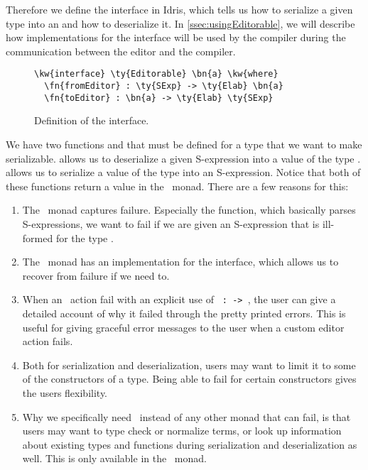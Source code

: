 Therefore we define the interface  in Idris, which tells us
how to serialize a given type into an  and how to deserialize it.
In \autoref{ssec:usingEditorable}, we will describe how implementations for
the  interface will be used by the compiler during the
communication between the editor and the compiler.

\begin{figure}[ht]
\caption{Definition of the  interface.}
\label{code:editorable}
\begin{Verbatim}[framesep=2mm, label=\footnotesize{\normalfont{Idris}}, labelposition=topline]
\kw{interface} \ty{Editorable} \bn{a} \kw{where}
  \fn{fromEditor} : \ty{SExp} -> \ty{Elab} \bn{a}
  \fn{toEditor} : \bn{a} -> \ty{Elab} \ty{SExp}
\end{Verbatim}
\end{figure}

We have two functions  and  that must be defined
for a type that we want to make serializable.
 allows us to deserialize a given S-expression into a value of the type .
 allows us to serialize a value of the type  into an S-expression.
Notice that both of these functions return a value in the \Elab\ monad.
There are a few reasons for this:
\begin{enumerate}
  \item The \Elab\ monad captures failure. Especially the 
    function, which basically parses S-expressions, we want to fail if we are
    given an S-expression that is ill-formed for the type .
  \item The \Elab\ monad has an implementation for the 
    interface, which allows us to recover from failure if we need to.
  \item When an \Elab\ action fail with an explicit use of
    \texttt{ :  ->  },
    the user can give a detailed account of why it failed through the pretty
    printed errors. This is useful for giving graceful error messages to the
    user when a custom editor action fails.
  \item Both for serialization and deserialization, users may want to limit it
    to some of the constructors of a type. Being able to fail for certain
    constructors gives the users flexibility.
  \item Why we specifically need \Elab\ instead of any other monad that can
    fail, is that users may want to type check or normalize terms, or look up
    information about existing types and functions during serialization and
    deserialization as well. This is only available in the \Elab\ monad.
\end{enumerate}

